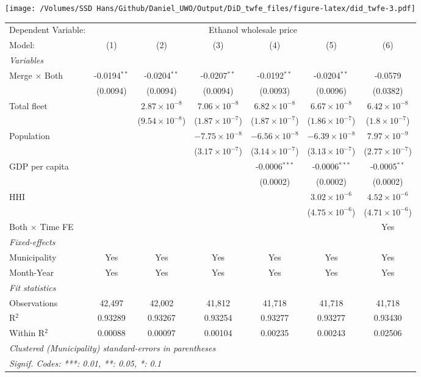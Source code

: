 \documentclass[
]{article}
\begin{document}
\texttt{[image: /Volumes/SSD Hans/Github/Daniel\_UWO/Output/DiD\_twfe\_files/figure-latex/did\_twfe-3.pdf]}

\begin{tabular}{lcccccc}
\tabularnewline\midrule\midrule
Dependent Variable:&\multicolumn{6}{c}{Ethanol wholesale price}\\
Model:&(1) & (2) & (3) & (4) & (5) & (6)\\
\midrule \emph{Variables}&   &   &   &   &   &  \\
Merge $\times $ Both & -0.0194$^{**}$ & -0.0204$^{**}$ & -0.0207$^{**}$ & -0.0192$^{**}$ & -0.0204$^{**}$ & -0.0579\\
  &(0.0094) & (0.0094) & (0.0094) & (0.0093) & (0.0096) & (0.0382)\\
Total fleet &    & $2.87\times 10^{-8}$ & $7.06\times 10^{-8}$ & $6.82\times 10^{-8}$ & $6.67\times 10^{-8}$ & $6.42\times 10^{-8}$\\
  &   & ($9.54\times 10^{-8}$) & ($1.87\times 10^{-7}$) & ($1.87\times 10^{-7}$) & ($1.86\times 10^{-7}$) & ($1.8\times 10^{-7}$)\\
Population &    &    & $-7.75\times 10^{-8}$ & $-6.56\times 10^{-8}$ & $-6.39\times 10^{-8}$ & $7.97\times 10^{-9}$\\
  &   &    & ($3.17\times 10^{-7}$) & ($3.14\times 10^{-7}$) & ($3.13\times 10^{-7}$) & ($2.77\times 10^{-7}$)\\
GDP per capita &    &    &    & -0.0006$^{***}$ & -0.0006$^{***}$ & -0.0005$^{**}$\\
  &   &    &    & (0.0002) & (0.0002) & (0.0002)\\
HHI &    &    &    &    & $3.02\times 10^{-6}$ & $4.52\times 10^{-6}$\\
  &   &    &    &    & ($4.75\times 10^{-6}$) & ($4.71\times 10^{-6}$)\\
Both $\times$ Time FE &  &  &  &  &  & Yes\\
\midrule \emph{Fixed-effects}&   &   &   &   &   &  \\
Municipality & Yes & Yes & Yes & Yes & Yes & Yes\\
Month-Year & Yes & Yes & Yes & Yes & Yes & Yes\\
\midrule \emph{Fit statistics}&  & & & & & \\
Observations & 42,497&42,002&41,812&41,718&41,718&41,718\\
R$^2$ & 0.93289&0.93267&0.93254&0.93277&0.93277&0.93430\\
Within R$^2$ & 0.00088&0.00097&0.00104&0.00235&0.00243&0.02506\\
\midrule\midrule\multicolumn{7}{l}{\emph{Clustered (Municipality) standard-errors in parentheses}}\\
\multicolumn{7}{l}{\emph{Signif. Codes: ***: 0.01, **: 0.05, *: 0.1}}\\
\end{tabular}
\end{document}
